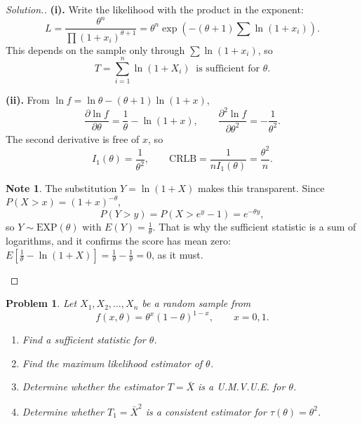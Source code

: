 \documentclass[12pt,a4paper]{report}
\theoremstyle{definition}
\newtheorem{note}[thm]{Note}
\theoremstyle{plain}
\newtheorem{problemx}{Problem}[section]
\newenvironment{problem}{\begin{problemx}}{\end{problemx}}
\newenvironment{solution}
  {\renewcommand{\qedsymbol}{}\begin{proof}[\textit{Solution}.]}
  {\end{proof}}
\begin{document}
\begin{solution}
\textbf{(i).} Write the likelihood with the product in the exponent:
\[L=\frac{\theta^n}{\prod(1+x_i)^{\theta+1}}
=\theta^n\exp\!\left(-(\theta+1)\sum\ln(1+x_i)\right).\]
This depends on the sample only through $\sum\ln(1+x_i)$, so
\[T=\sum_{i=1}^n\ln\left(1+X_i\right)\ \text{ is sufficient for }\theta.\]

\textbf{(ii).} From $\ln f=\ln\theta-(\theta+1)\ln(1+x)$,
\[\frac{\partial\ln f}{\partial\theta}=\frac{1}{\theta}-\ln(1+x),\qquad
\frac{\partial^2\ln f}{\partial\theta^2}=-\frac{1}{\theta^2}.\]
The second derivative is free of $x$, so
\[I_1(\theta)=\frac{1}{\theta^2},\qquad
\text{CRLB}=\frac{1}{nI_1(\theta)}=\frac{\theta^2}{n}.\]

\begin{note}
The substitution $Y=\ln(1+X)$ makes this transparent. Since
$P(X>x)=(1+x)^{-\theta}$,
\[P(Y>y)=P\!\left(X>e^y-1\right)=e^{-\theta y},\]
so $Y\sim\text{EXP}(\theta)$ with $E(Y)=\frac{1}{\theta}$. That is why the
sufficient statistic is a sum of logarithms, and it confirms the score has mean
zero: $E\!\left[\frac{1}{\theta}-\ln(1+X)\right]=\frac{1}{\theta}-\frac{1}{\theta}=0$,
as it must.
\end{note}
\end{solution}


\begin{problem}
Let $X_1,X_2,\ldots,X_n$ be a random sample from
\[f(x,\theta)=\theta^x(1-\theta)^{1-x},\qquad x=0,1.\]
\begin{enumerate}
\item[(a).] Find a sufficient statistic for $\theta$.
\item[(b).] Find the maximum likelihood estimator of $\theta$.
\item[(c).] Determine whether the estimator $T=\bar X$ is a U.M.V.U.E. for
$\theta$.
\item[(d).] Determine whether $T_1=\bar X^2$ is a consistent estimator for
$\tau(\theta)=\theta^2$.
\end{enumerate}
\end{problem}
\end{document}
